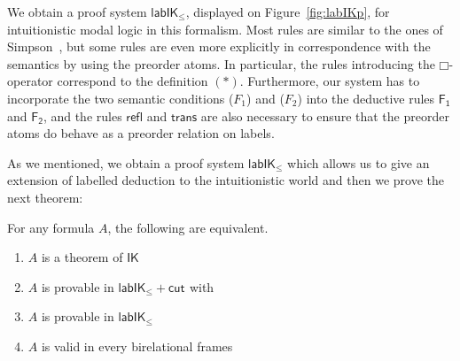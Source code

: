 \documentclass[twoside]{aiml18}
\newcommand{\todo}[1]{{\color{red}[TODO: #1]}}
\newcommand{\B}{\mathcal{B}}
\newcommand*{\lab}{\mathsf{lab}}
\newcommand*{\IK}{\mathsf{IK}}
\newcommand*{\labIKp}{\lab\IK_{\le}}
\newcommand*{\BOX}{\mathord{\Box}}
\newcommand*{\labels}[2]{{\color{blue}{#1}\:\colon}{#2}}
\newcommand{\SEQ}{\Rightarrow}
\newcommand*{\rn}[1]  {\ensuremath{\mathsf{#1}}}
\newcommand*{\labrn}[2][]  {\rn{#2}_{#1}}%
\begin{document}
%
We obtain a proof system $\labIKp$, displayed on Figure~\ref{fig:labIKp}, for intuitionistic modal logic in this formalism. 
%
Most rules are similar to the ones of Simpson~\cite{Simpson}, but some rules are even more explicitly in correspondence with the semantics by using the preorder atoms. 
%
In particular, the rules introducing the $\BOX$-operator correspond to the definition $(\ast)$.
%
Furthermore, our system has to incorporate the two semantic conditions ($F_1$) and ($F_2$) into the deductive rules $\rn{F_1}$ and $\rn{F_2}$, and the rules $\rn{refl}$ and $\rn{trans}$ are also necessary to ensure that the preorder atoms do behave as a preorder relation on labels.

As we mentioned, we obtain a proof system $\labIKp$ which allows us to give an extension of labelled deduction to the intuitionistic world and then we prove the next theorem:

%
%


\begin{theorem}\label{thm:cutfree-compl}
	For any formula $A$, the following are equivalent.
	\begin{enumerate}
		\item\label{i} $A$ is a theorem of $\IK$ 
		\item\label{ii} $A$ is provable in $\labIKp +\labrn{cut}$ with %
%		
		\smash{%
			\scalebox{.9}{$\vliinf{\labrn{cut}}{}{\B_1, \B_2, \Left \SEQ \Right}{\B_1, \Left \SEQ \Right, \labels{z}{C}}{\B_2, \Left, \labels{z}{C} \SEQ \Right}$}
		}%
		\item\label{iii} $A$ is provable in $\labIKp$
		\item\label{iv} $A$ is valid in every birelational frames %
	\end{enumerate}
\end{theorem}
\end{document}
